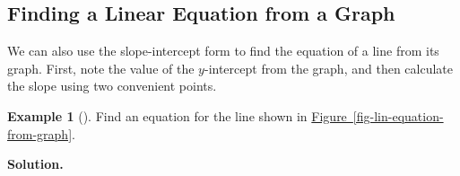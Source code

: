 \documentclass[10pt,]{book}
\theoremstyle{plain}
\theoremstyle{definition}
\theoremstyle{definition}
\newtheorem{example}[theorem]{Example}
\theoremstyle{definition}
\theoremstyle{definition}
\numberwithin{equation}{part}
\newlength{\panelmax}
\begin{document}
\subsection[{Finding a Linear Equation from a Graph}]{Finding a Linear Equation from a Graph}\label{subsection-30}
We can also use the slope-intercept form to find the equation of a line from its graph. First, note the value of the \(y\)-intercept from the graph, and then calculate the slope using two convenient points.%
\begin{example}[]\label{example-lin-equation-from-graph}
Find an equation for the line shown in \hyperref[fig-lin-equation-from-graph]{Figure~\ref{fig-lin-equation-from-graph}}.%
\par\medskip\noindent%
\textbf{Solution.}\quad %
{%
\setlength{\panelmax}{0pt}
\newsavebox{\panelboxBOHp}
\newlength{\phBOHp}\setlength{\phBOHp}{\ht\panelboxBOHp+\dp\panelboxBOHp}
\settototalheight{\phBOHp}{\usebox{\panelboxBOHp}}
\setlength{\panelmax}{\maxof{\panelmax}{\phBOHp}}
\newsavebox{\panelboxGJimage}
}
\end{example}
\end{document}
